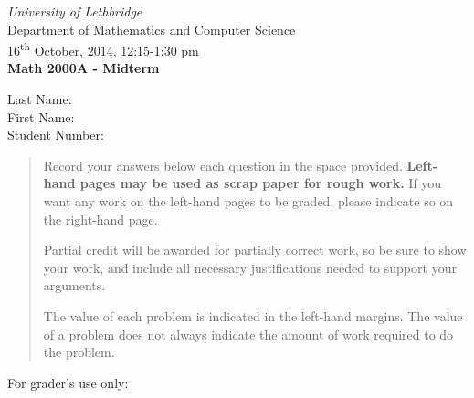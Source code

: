 \documentclass[12pt]{article}
\newcommand{\skipline}{\vspace{12pt}}
\begin{document}
\author{Instructor: Sean Fitzpatrick}
\thispagestyle{plain}
\begin{center}
\emph{University of Lethbridge}\\
Department of Mathematics and Computer Science\\
16\textsuperscript{th} October, 2014, 12:15-1:30 pm\\
{\bf Math 2000A - Midterm}\\
\end{center}
\skipline \skipline \skipline \noindent \skipline
Last Name:\underline{\hspace{50pt}{\bf SOLUTIONS}\hspace{50pt}}\\
\skipline
First Name:\underline{\hspace{50pt}{\bf THE}\hspace{100pt}}\\
\skipline
Student Number:\underline{\hspace{322pt}}\\


\vspace{0.5in}


\begin{quote}
 Record your answers below each question in the space provided.    {\bf Left-hand pages may be used as scrap paper for rough work.}  If you want any work on the left-hand pages to be graded, please indicate so on the right-hand page.
 
 \bigskip
 
Partial credit will be awarded for partially correct work, so be sure to show your work, and include all necessary justifications needed to support your arguments. 

The value of each problem is indicated in the left-hand margins. The value of a problem does not always indicate the amount of work required to do the problem.
\end{quote}


\vspace{0.5in}

For grader's use only:
\end{document}
